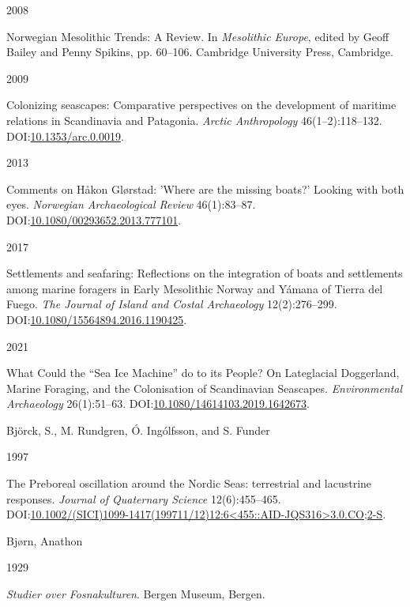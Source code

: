 \documentclass[
  12pt,
  a4paper,
  oneside]{book}
\newlength{\cslhangindent}
\newlength{\csllabelwidth}
\newlength{\cslentryspacingunit} %
\newenvironment{CSLReferences}[2] %
 {%
  \setlength{\parindent}{0pt}
  \ifodd #1
  \let\oldpar\par
  \def\par{\hangindent=\cslhangindent\oldpar}
  \fi
  \setlength{\parskip}{#2\cslentryspacingunit}
 }%
 {}
\newcommand{\CSLBlock}[1]{#1\hfill\break}
\newcommand{\CSLLeftMargin}[1]{\parbox[t]{\csllabelwidth}{#1}}
\newcommand{\CSLRightInline}[1]{\parbox[t]{\linewidth - \csllabelwidth}{#1}\break}
\begin{document}
\begin{CSLReferences}{0}{0}
\leavevmode{}%
\CSLLeftMargin{ 2008 }%
\CSLRightInline{{Norwegian Mesolithic Trends: A Review}. In \emph{{Mesolithic Europe}}, edited by Geoff Bailey and Penny Spikins, pp. 60--106. Cambridge University Press, Cambridge.}

\leavevmode{}%
\CSLLeftMargin{ 2009 }%
\CSLRightInline{{Colonizing seascapes: Comparative perspectives on the development of maritime relations in Scandinavia and Patagonia}. \emph{Arctic Anthropology} 46(1--2):118--132. DOI:\href{https://doi.org/10.1353/arc.0.0019}{10.1353/arc.0.0019}.}

\leavevmode{}%
\CSLLeftMargin{ 2013 }%
\CSLRightInline{{Comments on Håkon Glørstad: 'Where are the missing boats?' Looking with both eyes}. \emph{Norwegian Archaeological Review} 46(1):83--87. DOI:\href{https://doi.org/10.1080/00293652.2013.777101}{10.1080/00293652.2013.777101}.}

\leavevmode{}%
\CSLLeftMargin{ 2017 }%
\CSLRightInline{{Settlements and seafaring: Reflections on the integration of boats and settlements among marine foragers in Early Mesolithic Norway and Yámana of Tierra del Fuego}. \emph{The Journal of Island and Costal Archaeology} 12(2):276--299. DOI:\href{https://doi.org/10.1080/15564894.2016.1190425}{10.1080/15564894.2016.1190425}.}

\leavevmode{}%
\CSLLeftMargin{ 2021 }%
\CSLRightInline{{What Could the {``Sea Ice Machine''} do to its People? On Lateglacial Doggerland, Marine Foraging, and the Colonisation of Scandinavian Seascapes}. \emph{Environmental Archaeology} 26(1):51--63. DOI:\href{https://doi.org/10.1080/14614103.2019.1642673}{10.1080/14614103.2019.1642673}.}

\leavevmode{}%
\CSLBlock{Björck, S., M. Rundgren, Ó. Ingólfsson, and S. Funder}
\CSLLeftMargin{ 1997}%
\CSLRightInline{{The Preboreal oscillation around the Nordic Seas: terrestrial and lacustrine responses}. \emph{Journal of Quaternary Science} 12(6):455--465. DOI:\href{https://doi.org/10.1002/(SICI)1099-1417(199711/12)12:6\%3C455::AID-JQS316\%3E3.0.CO;2-S}{10.1002/(SICI)1099-1417(199711/12)12:6\textless455::AID-JQS316\textgreater3.0.CO;2-S}.}

\leavevmode{}%
\CSLBlock{Bjørn, Anathon}
\CSLLeftMargin{ 1929}%
\CSLRightInline{\emph{{Studier over Fosnakulturen}}. Bergen Museum, Bergen.}


\end{CSLReferences}
\end{document}
